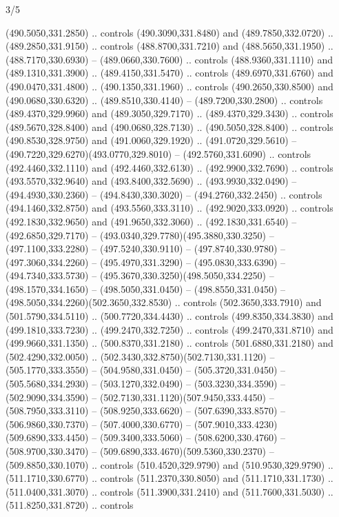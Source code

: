 \begin{flagdescription}{3/5}
\begin{scope}[shift={(0.5\flaglength,0.5\flagwidth)},scale=\flagwidth/1075]
\begin{scope}[y=0.80pt, x=0.80pt, yscale=-2.37, xscale=2.37,xshift=-402,yshift=-230.4]
  (490.5050,331.2850) .. controls (490.3090,331.8480) and (489.7850,332.0720) ..
  (489.2850,331.9150) .. controls (488.8700,331.7210) and (488.5650,331.1950) ..
  (488.7170,330.6930) -- (489.0660,330.7600) .. controls (488.9360,331.1110) and
  (489.1310,331.3900) .. (489.4150,331.5470) .. controls (489.6970,331.6760) and
  (490.0470,331.4800) .. (490.1350,331.1960) .. controls (490.2650,330.8500) and
  (490.0680,330.6320) .. (489.8510,330.4140) -- (489.7200,330.2800) .. controls
  (489.4370,329.9960) and (489.3050,329.7170) .. (489.4370,329.3430) .. controls
  (489.5670,328.8400) and (490.0680,328.7130) .. (490.5050,328.8400) .. controls
  (490.8530,328.9750) and (491.0060,329.1920) .. (491.0720,329.5610) --
  (490.7220,329.6270)(493.0770,329.8010) -- (492.5760,331.6090) .. controls
  (492.4460,332.1110) and (492.4460,332.6130) .. (492.9900,332.7690) .. controls
  (493.5570,332.9640) and (493.8400,332.5690) .. (493.9930,332.0490) --
  (494.4930,330.2360) -- (494.8430,330.3020) -- (494.2760,332.2450) .. controls
  (494.1460,332.8750) and (493.5560,333.3110) .. (492.9020,333.0920) .. controls
  (492.1830,332.9650) and (491.9650,332.3060) .. (492.1830,331.6540) --
  (492.6850,329.7170) -- (493.0340,329.7780)(495.3880,330.3250) --
  (497.1100,333.2280) -- (497.5240,330.9110) -- (497.8740,330.9780) --
  (497.3060,334.2260) -- (495.4970,331.3290) -- (495.0830,333.6390) --
  (494.7340,333.5730) -- (495.3670,330.3250)(498.5050,334.2250) --
  (498.1570,334.1650) -- (498.5050,331.0450) -- (498.8550,331.0450) --
  (498.5050,334.2260)(502.3650,332.8530) .. controls (502.3650,333.7910) and
  (501.5790,334.5110) .. (500.7720,334.4430) .. controls (499.8350,334.3830) and
  (499.1810,333.7230) .. (499.2470,332.7250) .. controls (499.2470,331.8710) and
  (499.9660,331.1350) .. (500.8370,331.2180) .. controls (501.6880,331.2180) and
  (502.4290,332.0050) .. (502.3430,332.8750)(502.7130,331.1120) --
  (505.1770,333.3550) -- (504.9580,331.0450) -- (505.3720,331.0450) --
  (505.5680,334.2930) -- (503.1270,332.0490) -- (503.3230,334.3590) --
  (502.9090,334.3590) -- (502.7130,331.1120)(507.9450,333.4450) --
  (508.7950,333.3110) -- (508.9250,333.6620) -- (507.6390,333.8570) --
  (506.9860,330.7370) -- (507.4000,330.6770) --
  (507.9010,333.4230)(509.6890,333.4450) -- (509.3400,333.5060) --
  (508.6200,330.4760) -- (508.9700,330.3470) --
  (509.6890,333.4670)(509.5360,330.2370) -- (509.8850,330.1070) .. controls
  (510.4520,329.9790) and (510.9530,329.9790) .. (511.1710,330.6770) .. controls
  (511.2370,330.8050) and (511.1710,331.1730) .. (511.0400,331.3070) .. controls
  (511.3900,331.2410) and (511.7600,331.5030) .. (511.8250,331.8720) .. controls

\end{scope}
\end{scope}
\end{flagdescription}

